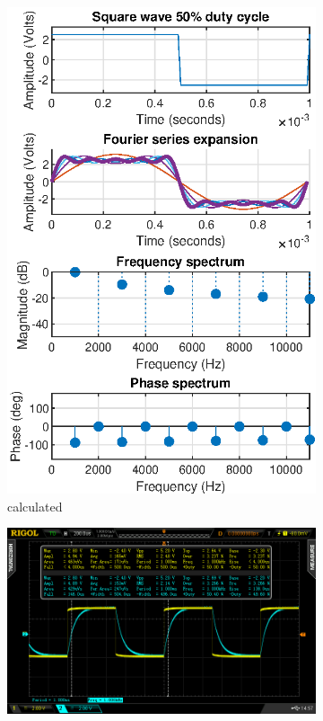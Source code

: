 \documentclass[notitlepage, a4paper, 11pt]{article}
\begin{document}
	\begin{figure}[H]
		\centering
		\begin{subfigure}[][][t]{0.3\textwidth}
			\includegraphics[width=\textwidth]{../Matlab/img/sqr50}
			\caption{calculated}
			\label{fig:calc-signals-b}
		\end{subfigure}
		\quad
		\begin{subfigure}[][][t]{0.3\textwidth}
			\includegraphics[width=\textwidth, trim=85 50 112 45, clip]{../img/osc/DS2_QuickPrint4.png}

\end{subfigure}
\end{figure}
\end{document}
